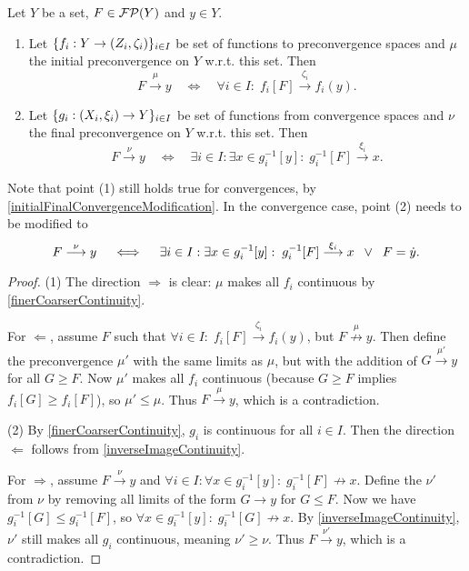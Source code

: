 \begin{proposition} \label{initialFinalConvergence}
Let $Y$ be a set, $F\in \operatorname{\mathcal{FP}}(Y)$ and $y\in Y$.
\begin{enumerate}
\item Let $\{f_i: Y\to \left( Z_i, \zeta_i \right)\}_{i\in I}$ be set of functions to preconvergence spaces and $\mu$ the initial preconvergence on $Y$ w.r.t. this set. Then
\[ F \overset{\mu}{\longrightarrow} y \quad\iff\quad \forall i\in I: \; f_i[F] \overset{\zeta_i}{\longrightarrow} f_i(y). \]
\item Let $\{g_i: \left( X_i, \xi_i \right) \to Y\}_{i\in I}$ be set of functions from convergence spaces and $\nu$ the final preconvergence on $Y$ w.r.t. this set. Then
\[ F \overset{\nu}{\longrightarrow} y \quad\iff\quad \exists i\in I: \exists x\in g_i^{-1}[y]: \; g_i^{-1}[F] \overset{\xi_i}{\longrightarrow} x. \]
\end{enumerate}
\end{proposition}
Note that point (1) still holds true for convergences, by \ref{initialFinalConvergenceModification}. In the convergence case, point (2) needs to be modified to 
\[ F \overset{\nu}{\longrightarrow} y \quad\iff\quad \exists i\in I: \exists x\in g_i^{-1}[y]: \; g_i^{-1}[F] \overset{\xi_i}{\longrightarrow} x \;\;\lor\;\; F = \dot{y}. \]
\begin{proof}
(1) The direction $\Rightarrow$ is clear: $\mu$ makes all $f_i$ continuous by \ref{finerCoarserContinuity}.

For $\Leftarrow$, assume $F$ such that $\forall i\in I: \; f_i[F] \overset{\zeta_i}{\longrightarrow} f_i(y)$, but $F \overset{\mu}{\not\to} y$. Then define the preconvergence $\mu'$ with the same limits as $\mu$, but with the addition of $G\overset{\mu'}{\longrightarrow} y$ for all $G\geq F$. Now $\mu'$ makes all $f_i$ continuous (because $G\geq F$ implies $f_i[G] \geq f_i[F]$), so $\mu'\leq \mu$. Thus $F \overset{\mu}{\longrightarrow} y$, which is a contradiction.

(2) By \ref{finerCoarserContinuity}, $g_i$ is continuous for all $i\in I$. Then the direction $\Leftarrow$ follows from \ref{inverseImageContinuity}.

For $\Rightarrow$, assume $F \overset{\nu}{\longrightarrow} y$ and $\forall i\in I: \forall x\in g_i^{-1}[y]: \; g_i^{-1}[F] \not\to x$. Define the $\nu'$ from $\nu$ by removing all limits of the form $G \to y$ for $G \leq F$. Now we have $g_i^{-1}[G] \leq g_i^{-1}[F]$, so $\forall x\in g_i^{-1}[y]: \; g_i^{-1}[G] \not\to x$. By \ref{inverseImageContinuity}, $\nu'$ still makes all $g_i$ continuous, meaning $\nu'\geq \nu$. Thus $F \overset{\nu'}{\longrightarrow} y$, which is a contradiction.
\end{proof}
